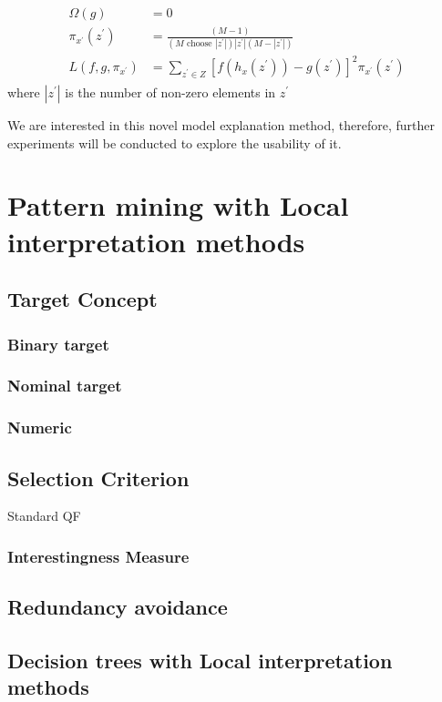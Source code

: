 \begin{equation} \label{eq:shap_kernel}
\begin{gathered}
\begin{aligned} \Omega(g) &=0 \\ \pi_{x^{\prime}}\left(z^{\prime}\right) &=\frac{(M-1)}{\left(M \text { choose }\left|z^{\prime}\right|\right)\left|z^{\prime}\right|\left(M-\left|z^{\prime}\right|\right)} \\ L\left(f, g, \pi_{x^{\prime}}\right) &=\sum_{z^{\prime} \in Z}\left[f\left(h_{x}\left(z^{\prime}\right)\right)-g\left(z^{\prime}\right)\right]^{2} \pi_{x^{\prime}}\left(z^{\prime}\right) \end{aligned}
\end{gathered}
\end{equation}
where $|z^\prime|$ is the number of non-zero elements in $z^\prime$

We are interested in this novel model explanation method, therefore, further experiments will be conducted to explore the usability of it. 


\section{Pattern mining with Local interpretation methods}

\subsection{Target Concept}

	\subsubsection{Binary target}
	\subsubsection{Nominal target}
	\subsubsection{Numeric}

\subsection{Selection Criterion}
Standard QF
\subsubsection{Interestingness Measure}
	
\subsection{Redundancy avoidance}

\subsection{Decision trees with Local interpretation methods}